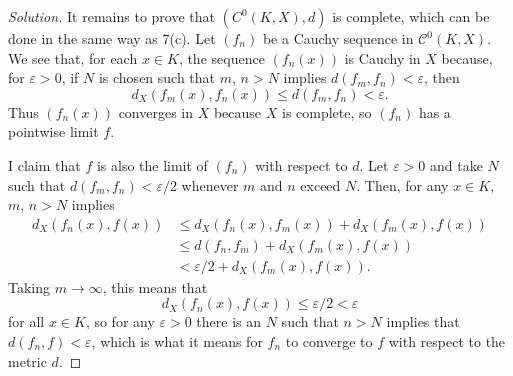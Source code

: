 \documentclass[11pt]{scrartcl}
\providecommand{\eps}{\varepsilon}
\newenvironment{soln}{\begin{proof}[Solution]}{\end{proof}}
\begin{document}
\begin{soln}
	It remains to prove that $(C^0(K, X), d)$ is complete,
	which can be done in the same way as 7(c).
	Let $(f_n)$ be a Cauchy sequence in $\mathcal C^0(K, X)$.
	We see that, for each $x\in K$, the sequence
	$(f_n(x))$ is Cauchy in $X$ because, for $\eps > 0$,
	if $N$ is chosen such that $m,\,n > N$ implies
	$d(f_m, f_n) < \eps$, then
	\[d_X(f_m(x), f_n(x)) \le d(f_m, f_n) < \eps.\]
	Thus $(f_n(x))$ converges in $X$ because $X$ is complete,
	so $(f_n)$ has a pointwise limit $f$.
	
	I claim that $f$ is also the limit of $(f_n)$ with respect to $d$.
	Let $\eps > 0$ and take $N$ such that $d(f_m, f_n) < \eps/2$
	whenever $m$ and $n$ exceed $N$. Then, for any $x\in K$,
	$m,\,n > N$ implies
	\begin{align*}
		d_X(f_n(x), f(x)) &\le d_X(f_n(x), f_m(x)) + d_X(f_m(x), f(x))\\
		&\le d(f_n, f_m) + d_X(f_m(x), f(x))\\
		& < \eps/2 + d_X(f_m(x), f(x)).
	\end{align*}
	Taking $m\to\infty$, this means that
	\[d_X(f_n(x), f(x)) \le \eps/2 < \eps\]
	for all $x\in K$, so for any $\eps > 0$ there is an $N$
	such that $n > N$ implies that $d(f_n, f)<\eps$,
	which is what it means for $f_n$ to converge to $f$
	with respect to the metric $d$.
\end{soln}
\end{document}
